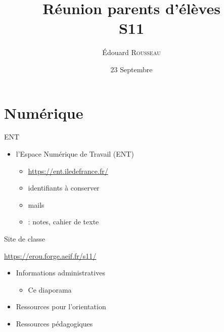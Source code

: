 \documentclass[17pt,xcolor=x11names]{beamer}
\begin{document}
\begin{frame}
  \title{Réunion parents d'élèves\\S11}
  \author{Édouard \textsc{Rousseau}}
\date{23 Septembre}
\titlepage
\end{frame}

\section*{Numérique}
\begin{frame}{ENT}
  \begin{itemize}
    \item {} l'Espace Numérique de Travail (ENT)
      \begin{itemize}
        \item \url{https://ent.iledefrance.fr/}
        \item identifiants à conserver
        \item mails
        \item {} : notes, cahier de texte
      \end{itemize}
  \end{itemize}
\end{frame}

\begin{frame}{Site de classe}
  \begin{center}
    \small
    \url{https://erou.forge.aeif.fr/s11/}
  \end{center}
  \begin{itemize}
    \item Informations administratives
      \begin{itemize}
        \item Ce diaporama
      \end{itemize}
    \item Ressources pour l'orientation
    \item Ressources pédagogiques
  \end{itemize}
\end{frame}
\end{document}
